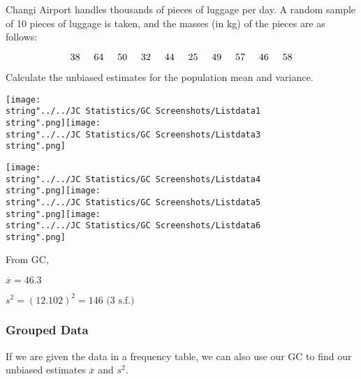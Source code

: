 \documentclass[11pt,a4paper]{book}
\begin{document}
\begin{example}

Changi Airport handles thousands of pieces of luggage per day. A random
sample of 10 pieces of luggage is taken, and the masses (in kg) of
the pieces are as follows:

\[
38\hspace{0.5cm}64\hspace{0.5cm}50\hspace{0.5cm}32\hspace{0.5cm}44\hspace{0.5cm}25\hspace{0.5cm}49\hspace{0.5cm}57\hspace{0.5cm}46\hspace{0.5cm}58
\]

Calculate the unbiased estimates for the population mean and variance.

\Solution

\texttt{[image: \\string"../../JC Statistics/GC Screenshots/Listdata1\\string".png]}\hspace{1cm}\texttt{[image: \\string"../../JC Statistics/GC Screenshots/Listdata3\\string".png]}

\texttt{[image: \\string"../../JC Statistics/GC Screenshots/Listdata4\\string".png]}\hspace{1cm}\texttt{[image: \\string"../../JC Statistics/GC Screenshots/Listdata5\\string".png]}\hspace{1cm}\texttt{[image: \\string"../../JC Statistics/GC Screenshots/Listdata6\\string".png]}

From GC, 

$\overline{x}=46.3$

$s^{2}=\left(12.102\right)^{2}=146\text{ (3 s.f.)}$

\end{example}

\subsubsection{Grouped Data}

If we are given the data in a frequency table, we can also use our
GC to find our unbiased estimates $\overline{x}$ and $s^{2}$.
\end{document}
